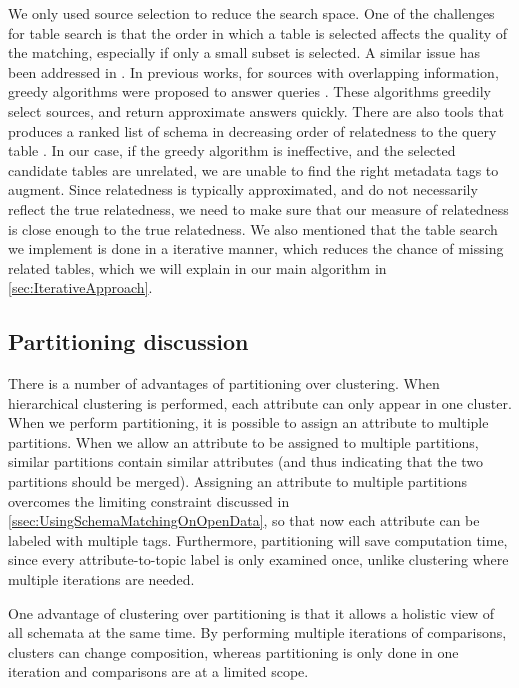 We only used source selection to reduce the search space. One of the challenges for table search is that the order in which a table is selected affects the quality of the matching, especially if only a small subset is selected. A similar issue has been addressed in \cite{Dong2012Proceedings}. In previous works, for sources with overlapping information, greedy algorithms were proposed to answer queries \cite{10.1145/1951365.1951414}. These algorithms greedily select sources, and return approximate answers quickly. There are also tools that produces a ranked list of schema in decreasing order of relatedness to the query table \cite{DBLP:conf/sigmod/ChenMH09}. In our case, if the greedy algorithm is ineffective, and the selected candidate tables are unrelated, we are unable to find the right metadata tags to augment. Since relatedness is typically approximated, and do not necessarily reflect the true relatedness, we need to make sure that our measure of relatedness is close enough to the true relatedness. We also mentioned that the table search we implement is done in a iterative manner, which reduces the chance of missing related tables, which we will explain in our main algorithm in \autoref{sec:IterativeApproach}.

\subsection{Partitioning discussion}
\label{ssec:PartitioningDiscussion}

There is a number of advantages of partitioning over clustering. When hierarchical clustering is performed, each attribute can only appear in one cluster. When we perform partitioning, it is possible to assign an attribute to multiple partitions. When we allow an attribute to be assigned to multiple partitions, similar partitions contain similar attributes (and thus indicating that the two partitions should be merged). Assigning an attribute to multiple partitions overcomes the limiting constraint discussed in \autoref{ssec:UsingSchemaMatchingOnOpenData}, so that now each attribute can be labeled with multiple tags. Furthermore, partitioning will save computation time, since every attribute-to-topic label is only examined once, unlike clustering where multiple iterations are needed.

One advantage of clustering over partitioning is that it allows a holistic view of all schemata at the same time. By performing multiple iterations of comparisons, clusters can change composition, whereas partitioning is only done in one iteration and comparisons are at a limited scope.

